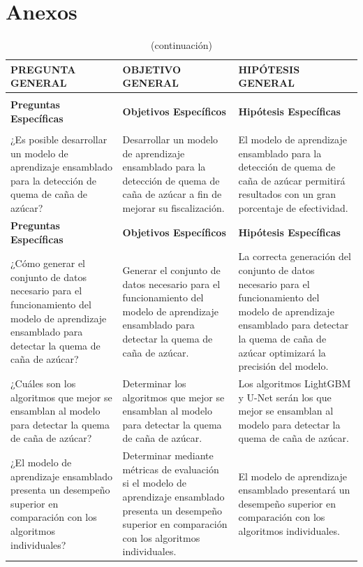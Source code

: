 \clearpage
\section{Anexos}
\begin{longtable}{>{\raggedright\arraybackslash}p{5cm}>{\raggedright\arraybackslash}p{5cm}>{\raggedright\arraybackslash}p{5cm}}
    \caption{Matriz de consistencia.} \label{tab:preguntas_objetivos_hipotesis} \\
    \hline
    \textbf{PREGUNTA GENERAL} & \textbf{OBJETIVO GENERAL} & \textbf{HIPÓTESIS GENERAL} \\
    \hline
    \endfirsthead 
    \caption[]{(continuación)} \\
    \hline
    \textbf{Preguntas Específicas} & \textbf{Objetivos Específicos} & \textbf{Hipótesis Específicas} \\
    \hline
    \endhead
    \hline
    \multicolumn{3}{r}{\textit{Continúa en la siguiente página ...}} \\
    \endfoot
    \hline
    \endlastfoot
    ¿Es posible desarrollar un modelo de aprendizaje ensamblado para la detección de quema de caña de azúcar? & Desarrollar un modelo de aprendizaje ensamblado para la detección de quema de caña de azúcar a fin de mejorar su fiscalización. & El modelo de aprendizaje ensamblado para la detección de quema de caña de azúcar permitirá resultados con un gran porcentaje de efectividad. \\
    \hline
    \textbf{Preguntas Específicas} & \textbf{Objetivos Específicos} & \textbf{Hipótesis Específicas} \\
    \hline
    ¿Cómo generar el conjunto de datos necesario para el funcionamiento del modelo de aprendizaje ensamblado para detectar la quema de caña de azúcar? & Generar el conjunto de datos necesario para el funcionamiento del modelo de aprendizaje ensamblado para detectar la quema de caña de azúcar. & La correcta generación del conjunto de datos necesario para el funcionamiento del modelo de aprendizaje ensamblado para detectar la quema de caña de azúcar optimizará la precisión del modelo. \\
    ¿Cuáles son los algoritmos que mejor se ensamblan al modelo para detectar la quema de caña de azúcar? & Determinar los algoritmos que mejor se ensamblan al modelo para detectar la quema de caña de azúcar. & Los algoritmos LightGBM y U-Net serán los que mejor se ensamblan al modelo para detectar la quema de caña de azúcar. \\
    ¿El modelo de aprendizaje ensamblado presenta un desempeño superior en comparación con los algoritmos individuales? & Determinar mediante métricas de evaluación si el modelo de aprendizaje ensamblado presenta un desempeño superior en comparación con los algoritmos individuales. & El modelo de aprendizaje ensamblado presentará un desempeño superior en comparación con los algoritmos individuales. \\
    \hline
\end{longtable}

